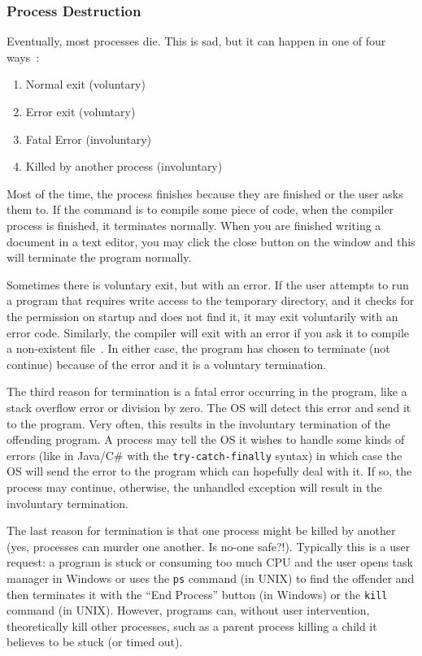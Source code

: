 \subsubsection*{Process Destruction}

Eventually, most processes die. This is sad, but it can happen in one of four ways~\cite{mos}:
\begin{enumerate}
	\item Normal exit (voluntary)
	\item Error exit (voluntary)
	\item Fatal Error (involuntary)
	\item Killed by another process (involuntary)
\end{enumerate}

Most of the time, the process finishes because they are finished or the user asks them to. If the command is to compile some piece of code, when the compiler process is finished, it terminates normally. When you are finished writing a document in a text editor, you may click the close button on the window and this will terminate the program normally.

Sometimes there is voluntary exit, but with an error. If the user attempts to run a program that requires write access to the temporary directory, and it checks for the permission on startup and does not find it, it may exit voluntarily with an error code. Similarly, the compiler will exit with an error if you ask it to compile a non-existent file~\cite{mos}. In either case, the program has chosen to terminate (not continue) because of the error and it is a voluntary termination.

The third reason for termination is a fatal error occurring in the program, like a stack overflow error or division by zero. The OS will detect this error and send it to the program. Very often, this results in the involuntary termination of the offending program. A process may tell the OS it wishes to handle some kinds of errors (like in Java/C\# with the \texttt{try-catch-finally} syntax) in which case the OS will send the error to the program which can hopefully deal with it. If so, the process may continue, otherwise, the unhandled exception will result in the involuntary termination.

The last reason for termination is that one process might be killed by another (yes, processes can murder one another. Is no-one safe?!). Typically this is a user request: a program is stuck or consuming too much CPU and the user opens task manager in Windows or uses the \texttt{ps} command (in UNIX) to find the offender and then terminates it with the ``End Process'' button (in Windows) or the \texttt{kill} command (in UNIX). However, programs can, without user intervention, theoretically kill other processes, such as a parent process killing a child it believes to be stuck (or timed out).

